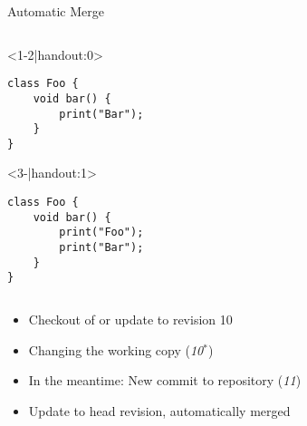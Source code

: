 \begin{frame}[fragile]{Automatic Merge}
\begin{columns}[onlytextwidth]
\begin{column}{0.6\linewidth}
\begin{columns}[T]
\begin{column}{0.5\linewidth}
					\begin{onlyenv}
						\begin{lstlisting}[style=java,basicstyle=\fontfamily{pcr}\small\selectfont,numbers=none,escapechar=|]
class Foo {
	void bar() {
		print("Bar");
	}
}
						\end{lstlisting}
					\end{onlyenv}
					\begin{onlyenv}
						\begin{lstlisting}[style=java,basicstyle=\fontfamily{pcr}\small\selectfont,numbers=none,escapechar=|]
class Foo {
	void bar() {
		print("Foo");
		print("Bar");
	}
}
						\end{lstlisting}
					\end{onlyenv}
				\end{column}
			\end{columns}
			
			\begin{example}{}
				\begin{itemize}
					\item<1-> Checkout of or update to revision 10
					\item<2-> Changing the working copy (\emph{10$^*$})
					\item<3-> In the meantime: New commit to repository (\emph{11})
					\item<4-> Update to head revision, automatically merged
				\end{itemize}			
			\end{example}
		\end{column}
		\begin{column}{0.5\linewidth}
		\end{column}
	\end{columns}
\end{frame}

